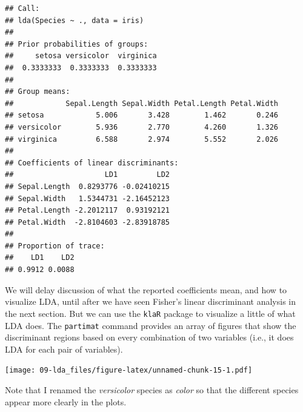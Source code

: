 \documentclass[
]{book}
\newenvironment{Shaded}{\begin{snugshade}}{\end{snugshade}}
\newcommand{\AttributeTok}[1]{\textcolor[rgb]{0.13,0.29,0.53}{#1}}
\newcommand{\FunctionTok}[1]{\textcolor[rgb]{0.13,0.29,0.53}{\textbf{#1}}}
\newcommand{\NormalTok}[1]{#1}
\newcommand{\OtherTok}[1]{\textcolor[rgb]{0.56,0.35,0.01}{#1}}
\newcommand{\SpecialCharTok}[1]{\textcolor[rgb]{0.81,0.36,0.00}{\textbf{#1}}}
\newcommand{\StringTok}[1]{\textcolor[rgb]{0.31,0.60,0.02}{#1}}
\theoremstyle{definition}
\theoremstyle{definition}
\theoremstyle{definition}
\theoremstyle{definition}
\theoremstyle{remark}
\begin{document}
\begin{verbatim}
## Call:
## lda(Species ~ ., data = iris)
## 
## Prior probabilities of groups:
##     setosa versicolor  virginica 
##  0.3333333  0.3333333  0.3333333 
## 
## Group means:
##            Sepal.Length Sepal.Width Petal.Length Petal.Width
## setosa            5.006       3.428        1.462       0.246
## versicolor        5.936       2.770        4.260       1.326
## virginica         6.588       2.974        5.552       2.026
## 
## Coefficients of linear discriminants:
##                     LD1         LD2
## Sepal.Length  0.8293776 -0.02410215
## Sepal.Width   1.5344731 -2.16452123
## Petal.Length -2.2012117  0.93192121
## Petal.Width  -2.8104603 -2.83918785
## 
## Proportion of trace:
##    LD1    LD2 
## 0.9912 0.0088
\end{verbatim}

We will delay discussion of what the reported coefficients mean, and how to visualize LDA, until after we have seen Fisher's linear discriminant analysis in the next section. But we can use the \texttt{klaR} package to visualize a little of what LDA does. The \texttt{partimat} command provides an array of figures that show the discriminant regions based on every combination of two variables (i.e., it does LDA for each pair of variables).

\begin{Shaded}
\end{Shaded}

\texttt{[image: 09-lda\_files/figure-latex/unnamed-chunk-15-1.pdf]}

Note that I renamed the \emph{versicolor} species as \emph{color} so that the different species appear more clearly in the plots.
\end{document}
